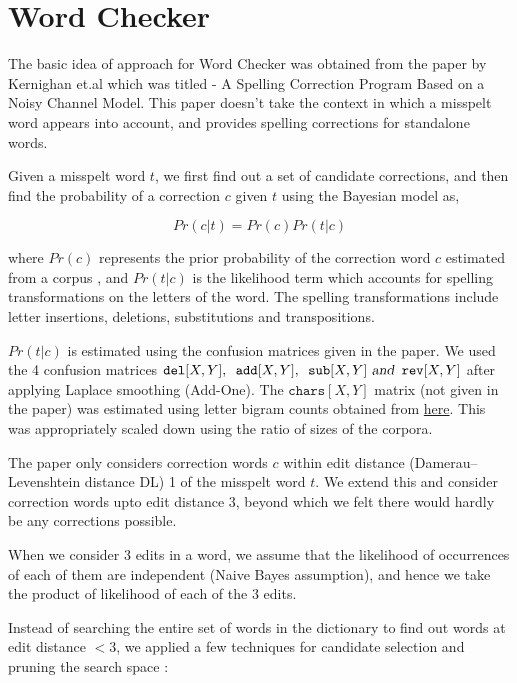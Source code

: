 \section{Word Checker}
\begin{flushleft}
The basic idea of approach for Word Checker was obtained from the paper by Kernighan et.al which was titled - A Spelling Correction Program Based on a Noisy Channel Model. This paper doesn't take the context in which a misspelt word appears into account, and provides spelling corrections for standalone words.

Given a misspelt word $t$, we first find out a set of candidate corrections, and then find the  probability of a correction $c$ given $t$ using the Bayesian model as, 

\[Pr(c|t) = Pr(c) Pr(t|c)\]

where $Pr(c)$ represents the prior probability of the correction word $c$ estimated from a corpus , and $Pr(t|c)$ is the likelihood term which accounts for spelling transformations on the letters of the word. The spelling transformations include letter insertions, deletions, substitutions and transpositions.

$Pr(t|c)$ is estimated using the confusion matrices given in the paper.
We used the 4 confusion matrices  $ \texttt{del} [X,Y], \texttt{ add}[X,Y], \texttt{ sub}[X,Y] \textsl{ and} \texttt{ rev}[X,Y]$ after applying Laplace smoothing (Add-One).
The $\texttt{chars}[X,Y]$ matrix (not given in the paper) was estimated using letter bigram counts obtained from \href{http://norvig.com/ngrams/}{here}. This was appropriately scaled down using the ratio of sizes of the corpora.

The paper only considers correction words $c$ within edit distance (Damerau–Levenshtein distance DL) 1 of the misspelt word $t$.
We extend this and consider correction words upto edit distance 3, beyond which we felt there would hardly be any corrections possible.

When we consider 3 edits in a word, we assume that the likelihood of occurrences of each of them are independent (Naive Bayes assumption), and hence we take the product of likelihood of each of the 3 edits.

Instead of searching the entire set of words in the dictionary to find out words at edit distance $< 3$, we applied a few techniques for candidate selection and pruning the search space :


\end{flushleft}
